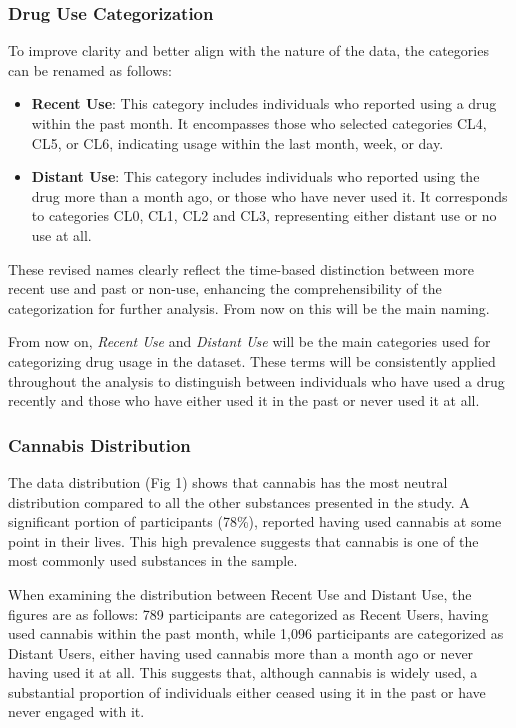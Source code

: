 \documentclass{article}
\begin{document}
\subsubsection{Drug Use Categorization}

To improve clarity and better align with the nature of the data, the categories can be renamed as follows:
\begin{itemize}

\item \textbf{Recent Use}: This category includes individuals who reported using a drug within the past month. It encompasses those who selected categories CL4, CL5, or CL6, indicating usage within the last month, week, or day.

\item \textbf{Distant Use}: This category includes individuals who reported using the drug more than a month ago, or those who have never used it. It corresponds to categories CL0, CL1, CL2 and CL3, representing either distant use or no use at all.

\end{itemize}
These revised names clearly reflect the time-based distinction between more recent use and past or non-use, enhancing the comprehensibility of the categorization for further analysis. From now on this will be the main naming.

From now on, \textit{Recent Use} and \textit{Distant Use} will be the main categories used for categorizing drug usage in the dataset. These terms will be consistently applied throughout the analysis to distinguish between individuals who have used a drug recently and those who have either used it in the past or never used it at all. 

\subsubsection{Cannabis Distribution}

\hspace{1cm}The data distribution (Fig 1) shows that cannabis has the most neutral distribution compared to all the other substances presented in the study. A significant portion of participants (78\%), reported having used cannabis at some point in their lives. This high prevalence suggests that cannabis is one of the most commonly used substances in the sample.

When examining the distribution between Recent Use and Distant Use, the figures are as follows: 789 participants are categorized as Recent Users, having used cannabis within the past month, while 1,096 participants are categorized as Distant Users, either having used cannabis more than a month ago or never having used it at all. This suggests that, although cannabis is widely used, a substantial proportion of individuals either ceased using it in the past or have never engaged with it.
\end{document}
